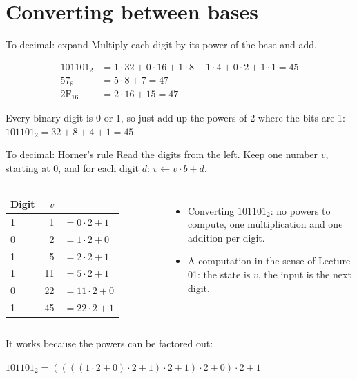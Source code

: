 \documentclass[10pt]{wosm-slides}
\makeatletter
\newcommand*\base[2]{\ensuremath{\mathrm{#1}_{#2}}}
\newenvironment{steps}[1]
  {\begin{tabular}{@{}#1@{}}\toprule}
  {\bottomrule\end{tabular}}
\makeatother
\begin{document}
\section{Converting between bases}

\begin{frame}{To decimal: expand}
  Multiply each digit by its power of the base and add.

  \medskip
  \begin{align*}
    \base{101101}{2} &= 1 \cdot 32 + 0 \cdot 16 + 1 \cdot 8 + 1 \cdot 4
      + 0 \cdot 2 + 1 \cdot 1 = 45 \\
    \base{57}{8} &= 5 \cdot 8 + 7 = 47 \\
    \base{2F}{16} &= 2 \cdot 16 + 15 = 47
  \end{align*}

  \medskip
  \begin{remark}
    Every binary digit is 0 or 1, so just add up the powers of 2 where the bits are
    1: $\base{101101}{2} = 32 + 8 + 4 + 1 = 45$.
  \end{remark}
\end{frame}

\begin{frame}{To decimal: Horner's rule}
  Read the digits from the left. Keep one number $v$, starting at 0, and for each
  digit $d$: \quad $v \leftarrow v \cdot b + d$.

  \medskip
  \begin{columns}[T, totalwidth=\textwidth]
      \small
      \begin{steps}{lrl}
        Digit & $v$ & \\
        \midrule
        1 & 1 & $= 0 \cdot 2 + 1$ \\
        0 & 2 & $= 1 \cdot 2 + 0$ \\
        1 & 5 & $= 2 \cdot 2 + 1$ \\
        1 & 11 & $= 5 \cdot 2 + 1$ \\
        0 & 22 & $= 11 \cdot 2 + 0$ \\
        1 & 45 & $= 22 \cdot 2 + 1$ \\
      \end{steps}
      \begin{itemize}
        \item Converting \base{101101}{2}: no powers to compute, one
          multiplication and one addition per digit.
        \item A computation in the sense of Lecture 01: the state is $v$, the input
          is the next digit.
      \end{itemize}
  \end{columns}

  \medskip
  It works because the powers can be factored out:\par\smallskip
  \centering
  $\base{101101}{2} = ((((1 \cdot 2 + 0) \cdot 2 + 1) \cdot 2 + 1) \cdot 2 + 0)
   \cdot 2 + 1$\par
\end{frame}
\end{document}

